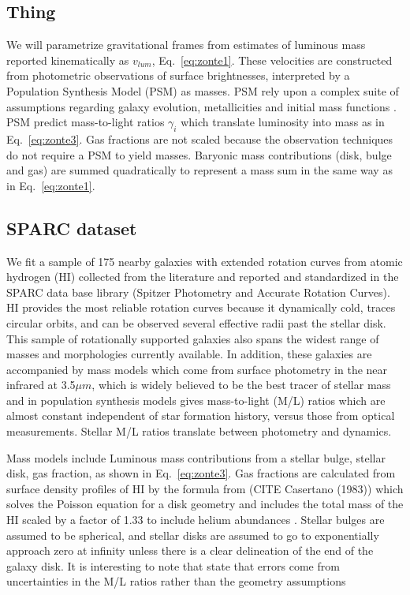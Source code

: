 \documentclass[reprint,%
 amsmath,amssymb,
 aps,
]{revtex4-1}
\begin{document}
  
  \subsection{Thing}
We will parametrize gravitational frames from estimates of luminous mass reported kinematically as  $v_{lum}$, Eq.~\ref{eq:zonte1}. These velocities  are constructed from photometric observations of surface brightnesses, interpreted   by a Population Synthesis Model (PSM)\cite{10.1093/mnras/sty3223} as     masses. 
PSM rely upon a complex  suite of  assumptions regarding galaxy evolution, metallicities and initial mass functions  \cite{BelldYong,10.1093/mnras/sty3223}. PSM predict   mass-to-light ratios  $\gamma_i$
 which translate  luminosity into mass as in Eq.~\ref{eq:zonte3}. 
Gas fractions are  not scaled because the observation techniques do not require a PSM to yield masses.  Baryonic mass contributions (disk, bulge and gas) are summed quadratically to represent a mass sum in the same way as in   Eq.~\ref{eq:zonte1}.

\subsection{SPARC dataset}
 
 We fit a sample  of  175 nearby galaxies with extended rotation curves from atomic hydrogen (HI) collected from the literature and reported and standardized in  the SPARC data base library (Spitzer Photometry and Accurate Rotation Curves\cite{2016Lelli}). HI provides the most reliable
 rotation curves because it dynamically cold, traces circular orbits, and can be observed several effective radii past the stellar disk. 
 This sample of rotationally supported galaxies also spans the widest range of masses and morphologies currently available. In addition, these galaxies are  accompanied by mass models which come from surface photometry in the 
   near infrared  at 3.5$\mu m$, which is widely believed to be the best tracer of stellar mass and in population synthesis models  gives mass-to-light (M/L) ratios which are almost constant independent of star formation history,  versus those from   optical measurements\cite{BelldYong,10.1093/mnras/sty3223}.  Stellar M/L ratios   translate between photometry and dynamics. 
   
   Mass models include Luminous mass contributions from a stellar bulge, stellar disk, gas fraction, as shown in Eq.~\ref{eq:zonte3}. Gas fractions are calculated from surface density profiles of HI by the formula from (CITE Casertano (1983)) which solves the Poisson equation for a disk geometry and
   includes the total mass of the HI scaled by a factor of 1.33 to include helium abundances . Stellar bulges are assumed to be spherical, and stellar disks are assumed to go to exponentially approach zero at  infinity unless there is a clear delineation of the end of the galaxy disk. It is interesting to note that \citet{2016Lelli} state that errors come from uncertainties in the M/L ratios rather than the geometry assumptions
   
\end{document}
